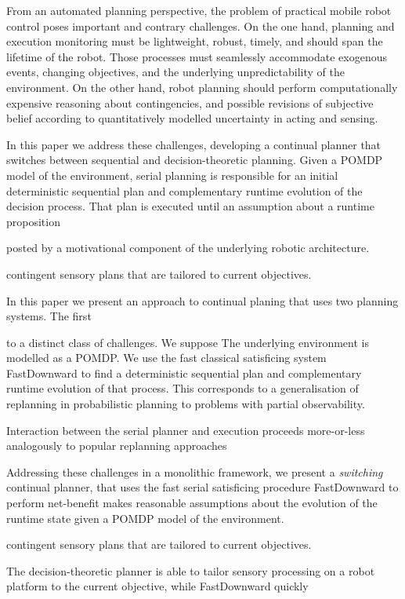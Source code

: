 \documentclass[letterpaper]{article}
\begin{document}
From an automated planning perspective, the problem of practical
mobile robot control poses important and contrary challenges.
On the one hand, planning and execution monitoring must be
lightweight, robust, timely, and should span the lifetime of the
robot. Those processes must seamlessly accommodate exogenous events,
changing objectives, and the underlying unpredictability of the
environment.
On the other hand, robot planning should perform computationally
expensive reasoning about contingencies, and possible revisions of
subjective belief according to quantitatively modelled uncertainty in
acting and sensing. 

In this paper we address these challenges, developing a continual
planner that switches between sequential and decision-theoretic
planning. Given a POMDP model of the environment, serial planning is
responsible for an initial deterministic sequential plan and
complementary runtime evolution of the decision process. That plan is
executed until an assumption about a runtime proposition

posted by a motivational component of the underlying robotic
architecture. 

contingent sensory plans that are tailored to current
objectives.

In this paper we present an approach to continual planing that uses
two planning systems. The first 

 to a distinct class of
challenges. We suppose 
The underlying environment is modelled as a POMDP. We use the fast
classical satisficing system FastDownward to find a deterministic
sequential plan and complementary runtime evolution of that
process. This corresponds to a generalisation of replanning in
probabilistic planning to problems with partial observability.

Interaction between the serial planner and execution proceeds
more-or-less analogously to popular replanning approaches

Addressing these challenges in a monolithic framework, we present a
{\em switching} continual planner, that uses the fast serial
satisficing procedure FastDownward to perform net-benefit
makes reasonable assumptions about the evolution of the runtime state
given a POMDP model of the environment. 

contingent sensory plans that are tailored to current
objectives.


The decision-theoretic planner is able to tailor sensory processing on
a robot platform to the current objective, while FastDownward  quickly 
\end{document}
